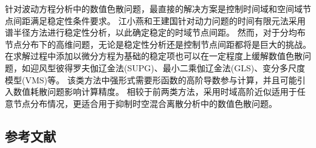针对波动方程分析中的数值色散问题，最直接的解决方案是控制时间域和空间域节点间距满足稳定性条件要求\cite{bajer1986}。
江小燕和王建国\cite{JiangXiaoYan2014}针对动力问题的时间有限元法采用谱半径方法进行稳定性分析，以此确定稳定的时域节点间距。
然而，对于分均布节点分布下的高维问题，无论是稳定性分析还是控制节点间距都将是巨大的挑战。
在求解过程中添加以微分方程为基础的稳定项也可以在一定程度上缓解数值色散问题，如迎风型彼得罗夫伽辽金法(SUPG)\cite{hughes1988}、最小二乘伽辽金法(GLS)\cite{hughes2000}、变分多尺度模型(VMS)\cite{hughes1996}等。
该类方法中强形式需要形函数的高阶导数参与计算，并且可能引入数值耗散问题影响计算精度。
相较于前两类方法，采用时域高阶近似适用于任意节点分布情况，更适合用于抑制时空混合离散分析中的数值色散问题。

\vspace{-5pt}

\begin{REF}
	\subsection*{参考文献}
	\vspace{-50pt}
	
\end{REF}

\newpage%
